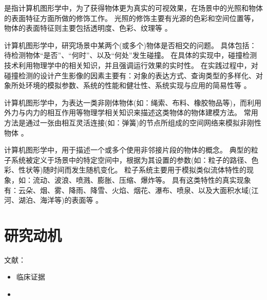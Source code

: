 \begin{definition}[渲染]
是指计算机图形学中，为了获得物体更为真实的可视效果，在场景中的光照和物体的表面特征方面所做的修饰工作。
光照的修饰主要有光源的色彩和空间位置等，物体的表面特征则主要包括透明度、色彩、纹理等 \cite{Hearn2004CGBook}。
\end{definition}

\begin{definition}[碰撞检测]
计算机图形学中，研究场景中某两个(或多个)物体是否相交的问题。
具体包括：待检测物体“是否”、“何时”、以及“何处”发生碰撞。
在具体的实现中，碰撞检测技术利用物理学中的相关知识，并且强调运行效果的实时性。
在实践过程中，对碰撞检测的设计产生影像的因素主要有：对象的表达方式、查询类型的多样化、对象所处环境的模拟参数、系统的性能和健壮性、系统实现与应用的简易性等 \cite{Ericson2005CDBook}。%
\end{definition}

\begin{definition}[形变模型]
计算机图形学中，为表达一类非刚体物体(如：绳索、布料、橡胶物品等)，而利用外力与内力的相互作用等物理学相关知识来描述这类物体的物体建模方法。
常用方法是通过一张由相互灵活连接(如：弹簧)的节点所组成的空间网络来模拟非刚性物体 \cite{Hearn2004CGBook}。
\end{definition}

\begin{definition}[中心线提取]
\end{definition}

\begin{definition}[状态机]
\end{definition}

\begin{definition}[粒子系统]
计算机图形学中，用于描述一个或多个使用非邻接片段的物体的概念。
典型的粒子系统被定义于场景中的特定空间中，根据为其设置的参数(如：粒子的路径、色彩、性状等)随时间而发生随机变化。
粒子系统主要用于模拟类似流体特性的现象，如：流动、波浪、喷溅、膨胀、压缩、爆炸等。
具有这类特性的真实现象有：云朵、烟、雾、降雨、降雪、火焰、烟花、瀑布、喷泉、以及大面积水域(江河、湖泊、海洋等)的表面等 \cite{Hearn2004CGBook}。
\end{definition}

\section{研究动机}
\label{sec1-2}

文献：
\begin{itemize}
\item 临床证据\cite{Aggarwal2006}
\item
\end{itemize}

